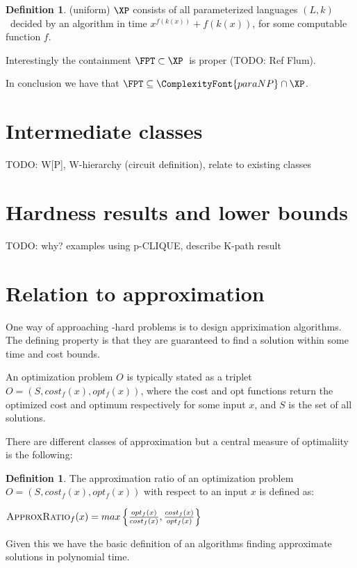 \documentclass[a4paper,11pt,notitlepage]{report}
\theoremstyle{plain}
\theoremstyle{definition}
\newtheorem{defn}[thm]{Definition} %
\newcommand{\PARANP}{\ComplexityFont{paraNP}}
\begin{document}
\begin{defn}
(uniform) $\XP$ consists of all parameterized languages $(L, k)$ decided by an algorithm in time
$x^{f(k(x))} + f(k(x))$, for some computable function $f$.
\end{defn}


Interestingly the containment $\FPT \subset \XP$ is proper (TODO: Ref Flum).

In conclusion we have that $\FPT \subseteq \PARANP \cap \XP$.

\section{Intermediate classes}
TODO: W[P], W-hierarchy (circuit definition), relate to existing classes

\section{Hardness results and lower bounds}
TODO: why? examples using p-CLIQUE, describe K-path result

\section{Relation to approximation}
One way of approaching \NP-hard problems is to design appriximation algorithms.
The defining property is that they are guaranteed to find a solution within some time and cost bounds.

An optimization problem $O$ is typically stated as a triplet $O = (S, cost_f(x), opt_f(x))$,
where the cost and opt functions return the optimized cost and optimum respectively for some input $x$, and $S$ is the set of all solutions.

There are different classes of approximation but a central measure of optimaliity is the following:

\begin{defn}
The approximation ratio of an optimization problem $O = (S, cost_f(x), opt_f(x))$ with respect to an input $x$ is defined as:

$\textsc{ApproxRatio}_f(x) = max \left\{ \frac{opt_f(x)}{cost_f(x)}, \frac{cost_f(x)}{opt_f(x)} \right\}$
\end{defn}

Given this we have the basic definition of an algorithms finding approximate solutions in polynomial time.
\end{document}
